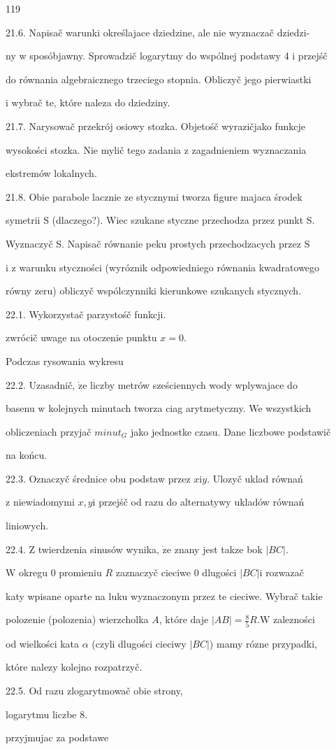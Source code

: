 \documentclass[a4paper,12pt]{article}
\begin{document}
119

21.6. Napisač warunki określajace dziedzine, ale nie wyznaczač dziedzi-

ny w sposóbjawny. Sprowadzič logarytmy do wspólnej podstawy 4 i przejśč

do równania algebraicznego trzeciego stopnia. Obliczyč jego pierwiastki

i wybrač te, które naleza do dziedziny.

21.7. Narysowač przekrój osiowy stozka. Objetośč wyrazičjako funkcje

wysokości stozka. Nie mylič tego zadania z zagadnieniem wyznaczania

ekstremów lokalnych.

21.8. Obie parabole lacznie ze stycznymi tworza figure majaca środek

symetrii S (dlaczego?). Wiec szukane styczne przechodza przez punkt S.

Wyznaczyč S. Napisač równanie peku prostych przechodzacych przez S

i z warunku styczności (wyróznik odpowiedniego równania kwadratowego

równy zeru) obliczyč wspólczynniki kierunkowe szukanych stycznych.

22.1. Wykorzystač parzystośč funkcji.

zwrócič uwage na otoczenie punktu $x=0.$

Podczas rysowania wykresu

22.2. Uzasadnič, $\dot{\mathrm{z}}\mathrm{e}$ liczby metrów sześciennych wody wplywajace do

basenu $\mathrm{w}$ kolejnych minutach tworza ciag arytmetyczny. We wszystkich

obliczeniach przyjač $minut_{G}$ jako jednostke czasu. Dane liczbowe podstawič

na końcu.

22.3. Oznaczyč średnice obu podstaw przez $x\mathrm{i}y$. Ulozyč uklad równań

$\mathrm{z}$ niewiadomymi $x, y \mathrm{i}$ przejśč od razu do alternatywy ukladów równań

liniowych.

22.4. $\mathrm{Z}$ twierdzenia sinusów wynika, $\dot{\mathrm{z}}\mathrm{e}$ znany jest takze bok $|BC|.$

$\mathrm{W}$ okregu $0$ promieniu $R$ zaznaczyč cieciwe $0$ dlugości $|BC| \mathrm{i}$ rozwazač

katy wpisane oparte na luku wyznaczonym przez $\mathrm{t}\mathrm{e}$ cieciwe. Wybrač takie

polozenie (polozenia) wierzcholka $A$, które daje $|AB|=\displaystyle \frac{8}{5}R. \mathrm{W}$ zalezności

od wielkości kata $\alpha$ (czyli dlugości cieciwy $|BC|$) mamy rózne przypadki,

które nalezy kolejno rozpatrzyč.

22.5. Od razu zlogarytmowač obie strony,

logarytmu liczbe 8.

przyjmujac za podstawe
\end{document}
